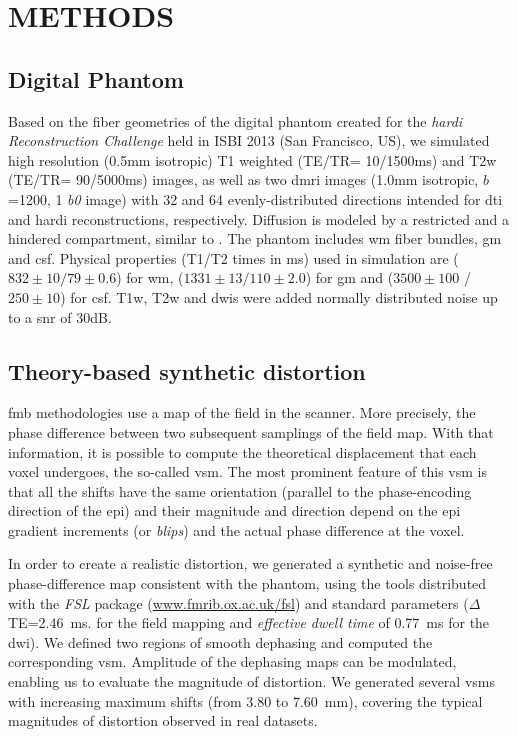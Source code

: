 \section{METHODS}\label{sec:methods}
\subsection{Digital Phantom}\label{sec:phantom}
Based on the fiber geometries of the digital phantom created
  for the \emph{\acrshort*{hardi} Reconstruction Challenge} held
  in ISBI 2013 (San Francisco, US), we simulated high resolution
  (0.5mm isotropic) T1 weighted (TE/TR= 10/1500ms) and T2w
  (TE/TR= 90/5000ms) images, as well as two \gls*{dmri} images
  (1.0mm isotropic, $b$=1200, 1 \emph{b0} image) with 32 and 64
  evenly-distributed directions intended for \gls*{dti} and 
  \gls*{hardi} reconstructions, respectively.
Diffusion is modeled by a restricted and a hindered compartment,
  similar to \cite{assaf_composite_2005}.
The phantom includes \gls*{wm} fiber bundles, \gls*{gm} and \gls*{csf}.
Physical properties (T1/T2 times in ms) used in simulation are
  ($832\pm10/79\pm0.6$) for \gls*{wm},
  ($1331\pm13/110\pm2.0$) for \gls*{gm} and
  ($3500\pm100$ / $250\pm10$) for \gls*{csf}.
T1w, T2w and \glspl*{dwi} were added normally distributed noise
  up to a \gls*{snr} of 30dB.

\subsection{Theory-based synthetic distortion}
\label{sec:distortion}
\Gls*{fmb} methodologies use a map of the field in the scanner.
More precisely, the phase difference between two subsequent samplings
  of the field map.
With that information, it is possible to compute the theoretical
  displacement that each voxel undergoes, the so-called \gls*{vsm}.
The most prominent feature of this \gls*{vsm} is that all the shifts
  have the same orientation (parallel to the phase-encoding direction
  of the \gls*{epi}) and their magnitude and direction depend on the 
  \gls*{epi} gradient increments (or \emph{blips})
  and the actual phase difference at the voxel.

In order to create a realistic distortion, we generated a synthetic and noise-free
  phase-difference map consistent with the phantom, using the tools distributed with
  the \emph{FSL} package %
  (\url{www.fmrib.ox.ac.uk/fsl}) and standard parameters ($\Delta$TE=2.46~ms. for the
  field mapping and \emph{effective dwell time} of 0.77~ms for the \gls*{dwi}).
We defined two regions of smooth dephasing and computed the corresponding \gls*{vsm}.
Amplitude of the dephasing maps can be modulated, enabling us to evaluate the
  magnitude of distortion.
We generated several \glspl*{vsm} with increasing maximum shifts (from 3.80 to 7.60~mm),
  covering the typical magnitudes of distortion observed in real datasets.

